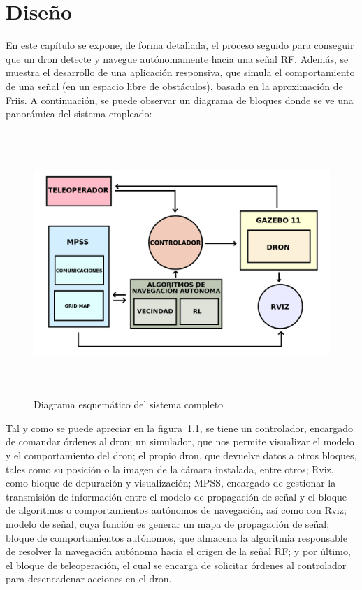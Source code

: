 \chapter{Diseño}
\label{cap:capitulo4}

En este capítulo se expone, de forma detallada, el proceso seguido para conseguir que un dron detecte y navegue autónomamente hacia una señal \ac{RF}. Además, se muestra el desarrollo de una aplicación responsiva, que simula el comportamiento de una señal (en un espacio libre de obstáculos), basada en la aproximación de Friis. A continuación, se puede observar un diagrama de bloques donde se ve una panorámica del sistema empleado:

\begin{figure} [t]
	\begin{center}
	\includegraphics[height=10cm]{imagenes/cap4/0_diagrama_general.png}
	\end{center}
	\caption[Diagrama esquemático del sistema completo]{Diagrama esquemático del sistema completo}
	\label{fig:diagrama}
\end{figure}

Tal y como se puede apreciar en la figura~\ref{fig:diagrama}, se tiene un controlador, encargado de comandar órdenes al dron; un simulador, que nos permite visualizar el modelo y el comportamiento del dron; el propio dron, que devuelve datos a otros bloques, tales como su posición o la imagen de la cámara instalada, entre otros; Rviz, como bloque de depuración y visualización; \ac{MPSS}, encargado de gestionar la transmisión de información entre el modelo de propagación de señal y el bloque de algoritmos o comportamientos autónomos de navegación, así como con Rviz; modelo de señal, cuya función es generar un mapa de propagación de señal; bloque de comportamientos autónomos, que almacena la algoritmia responsable de resolver la navegación autónoma hacia el origen de la señal \ac{RF}; y por último, el bloque de teleoperación, el cual se encarga de solicitar órdenes al controlador para desencadenar acciones en el dron.

